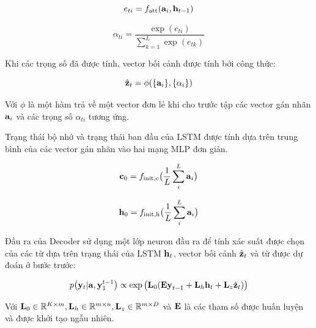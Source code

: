 \documentclass[14pt, a4paper]{article}
\numberwithin{equation}{section}
\numberwithin{algorithm}{section}
\numberwithin{figure}{section}
\numberwithin{dl}{section}
\numberwithin{md}{section}
\numberwithin{bd}{section}
\numberwithin{dn}{section}
\numberwithin{hq}{section}
\begin{document}
    \begin{equation}
        e_{ti}=f_{\mathrm{att}}(\bold{a}_i, \bold{h}_{t-1})
    \end{equation}

    \begin{equation}
        \alpha_{ti}=\dfrac{\exp(e_{ti})}{\displaystyle\sum_{k=1}^L \exp(e_{tk})}
    \end{equation}

    Khi các trọng số đã được tính, vector bối cảnh được tính bởi công thức:

    \begin{equation}
        \hat{\bold{z}}_t = \phi (\lbrace \bold{a}_i \rbrace, \lbrace \alpha_i \rbrace)
    \end{equation}
    
    Với $\phi$ là một hàm trả về một vector đơn lẻ khi cho trước tập các vector gán nhãn $\bold{a}_i$ và các trọng số $\alpha_{ti}$ tương ứng.

    Trạng thái bộ nhớ và trạng thái ban đầu của LSTM được tính dựa trên trung bình của các vector gán nhãn vào hai mạng MLP đơn giản.

    \begin{equation}
        \bold{c}_0 = f_{\mathrm{init, c}}\big(\dfrac{1}{L}\sum_i^L\bold{a}_i\big)
    \end{equation}

    \begin{equation}
        \bold{h}_0 = f_{\mathrm{init, h}}\big(\dfrac{1}{L}\sum_i^L\bold{a}_i\big)
    \end{equation}

    Đầu ra của Decoder sử dụng một lớp neuron đầu ra để tính xác suất được chọn của các từ dựa trên trạng thái của LSTM $\bold{h}_t$, vector bối cảnh $\hat{\bold{z}}_t$ và từ được dự đoán ở bước trước:

    \begin{equation} \label{eq:Output-Layer}
        p\big(\bold{y}_t\vert \bold{a}, \bold{y}_1^{t-1}\big) \propto \exp\big( \bold{L}_0(\bold{Ey}_{t-1} + \bold{L}_h\bold{h}_t + \bold{L}_z \hat{\bold{z}}_t) \big)
    \end{equation}

    Với $\bold{L}_0 \in \mathbb{R}^{K\times m}, \bold{L}_h \in \mathbb{R}^{m\times n}, \bold{L}_z \in \mathbb{R}^{m\times D}$ và $\bold{E}$ là các tham số được huấn luyện và được khởi tạo ngẫu nhiên.
\end{document}
